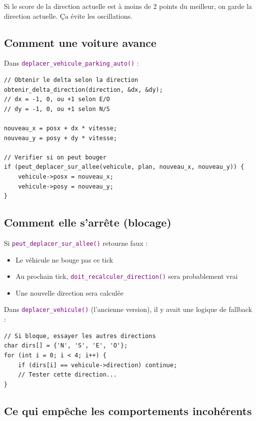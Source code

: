 \documentclass[11pt,a4paper]{article}
\newcommand{\fonction}[1]{\texttt{\textcolor{purple}{#1()}}}
\begin{document}
\begin{warningbox}[Hystérésis]
Si le score de la direction actuelle est à moins de 2 points du meilleur, on garde la direction actuelle. Ça évite les oscillations.
\end{warningbox}

\subsection{Comment une voiture avance}

Dans \fonction{deplacer\_vehicule\_parking\_auto} :

\begin{lstlisting}
// Obtenir le delta selon la direction
obtenir_delta_direction(direction, &dx, &dy);
// dx = -1, 0, ou +1 selon E/O
// dy = -1, 0, ou +1 selon N/S

nouveau_x = posx + dx * vitesse;
nouveau_y = posy + dy * vitesse;

// Verifier si on peut bouger
if (peut_deplacer_sur_allee(vehicule, plan, nouveau_x, nouveau_y)) {
    vehicule->posx = nouveau_x;
    vehicule->posy = nouveau_y;
}
\end{lstlisting}

\subsection{Comment elle s'arrête (blocage)}

Si \fonction{peut\_deplacer\_sur\_allee} retourne faux :
\begin{itemize}[noitemsep]
    \item Le véhicule ne bouge pas ce tick
    \item Au prochain tick, \fonction{doit\_recalculer\_direction} sera probablement vrai
    \item Une nouvelle direction sera calculée
\end{itemize}

Dans \fonction{deplacer\_vehicule} (l'ancienne version), il y avait une logique de fallback :
\begin{lstlisting}
// Si bloque, essayer les autres directions
char dirs[] = {'N', 'S', 'E', 'O'};
for (int i = 0; i < 4; i++) {
    if (dirs[i] == vehicule->direction) continue;
    // Tester cette direction...
}
\end{lstlisting}

\subsection{Ce qui empêche les comportements incohérents}
\end{document}
